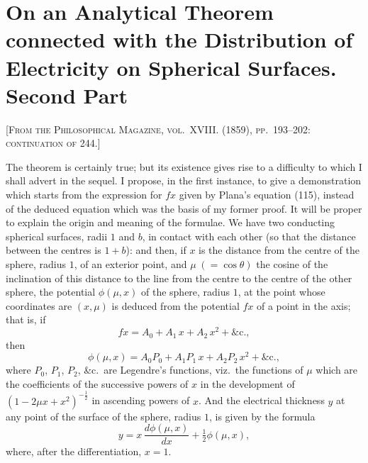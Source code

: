 \documentclass[11pt,a4paper]{article}
\begin{document}
\section{On an Analytical Theorem connected with the Distribution of Electricity on Spherical Surfaces. Second Part}
\label{paper:245}

\textsc{[From the Philosophical Magazine, vol.~XVIII. (1859), pp.~193--202: continuation of 244.]}

\setcounter{page}{99}

The theorem is certainly true; but its existence gives rise to a difficulty to which I shall advert in the sequel. I propose, in the first instance, to give a demonstration which starts from the expression for $fx$ given by Plana's equation (115), instead of the deduced equation which was the basis of my former proof. It will be proper to explain the origin and meaning of the formulae. We have two conducting spherical surfaces, radii $1$ and $b$, in contact with each other (so that the distance between the centres is $1 + b$): and then, if $x$ is the distance from the centre of the sphere, radius $1$, of an exterior point, and $\mu\;(= \cos\theta)$ the cosine of the inclination of this distance to the line from the centre to the centre of the other sphere, the potential $\phi(\mu, x)$ of the sphere, radius $1$, at the point whose coordinates are $(x, \mu)$ is deduced from the potential $fx$ of a point in the axis; that is, if
\[
fx = A_{0} + A_{1}\, x + A_{2}\, x^{2} + \&\mathrm{c.},
\]
then
\[
\phi(\mu, x) = A_{0} P_{0} + A_{1} P_{1}\, x + A_{2} P_{2}\, x^{2} + \&\mathrm{c.},
\]
where $P_{0}$, $P_{1}$, $P_{2}$, \&c.\ are Legendre's functions, viz.\ the functions of $\mu$ which are the coefficients of the successive powers of $x$ in the development of $(1 - 2\mu x + x^{2})^{-\frac{1}{2}}$ in ascending powers of $x$. And the electrical thickness $y$ at any point of the surface of the sphere, radius $1$, is given by the formula
\[
y = x\,\frac{d\phi(\mu, x)}{dx} + \tfrac{1}{2}\phi(\mu, x),
\]
where, after the differentiation, $x = 1$.

\setcounter{page}{100}
\end{document}
